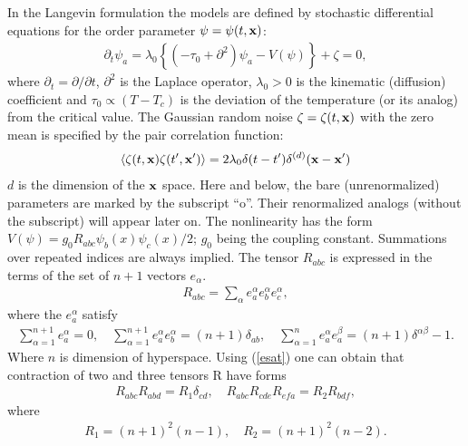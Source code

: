 \documentclass[12pt]{article}
\begin{document}
In the Langevin formulation the models are defined by stochastic
differential equations for the order parameter
$\psi = \psi(t,{\bf x})$:
\begin{eqnarray}
\partial_{t} \psi_{a} = \lambda_{0} \left\{ (-\tau_{0} +
\partial^{2}) \psi_{a} - V(\psi) \right\} + \zeta  = 0,
\label{stoh}
\end{eqnarray}
where $\partial_{t}= \partial/ \partial t$, $\partial^{2}$ is the
Laplace operator, $\lambda_{0}>0$ is the kinematic (diffusion)
coefficient and $\tau_{0} \propto (T-T_{c})$ is the deviation of
the temperature (or its analog) from the critical value.
 The Gaussian random noise
$\zeta=\zeta(t,{\bf x})$ with the zero mean is specified by the
pair correlation function:
\begin{eqnarray}
\langle \zeta (t,{\bf x})\zeta (t',{\bf x'}) \rangle =
2 \lambda_{0}  \delta(t-t')\delta^{(d)}({\bf x}-{\bf x}')
\label{kor1}
\end{eqnarray}
 $d$ is the dimension of the ${\bf x}$ space.  Here and below, the bare (unrenormalized) parameters are
marked by the subscript ``o''. Their renormalized analogs (without
the subscript) will appear later on.  The
nonlinearity has the form $V(\psi)=g_{0}R_{abc} \psi_{b}(x)\psi_{c}(x)/2$; $g_{0}$
 being the coupling constant. Summations over repeated indices are always implied.
The tensor $R_{abc}$ is expressed in the terms of the set of $n+1$ vectors $e_{\alpha}$.
\begin{eqnarray}
R_{abc}=\sum\limits_{\alpha}e^{\alpha}_{a}e^{\alpha}_{b}e^{\alpha}_{c},
\label{Rofe}
\end{eqnarray}
where the $e_{a}^{\alpha}$ satisfy
\begin{eqnarray}
\sum\limits_{\alpha=1}^{n+1}e^{\alpha}_{a}=0,\quad \sum\limits_{\alpha=1}^{n+1}e^{\alpha}_{a}e^{\alpha}_{b}=(n+1)\delta_{ab},\quad \sum\limits_{\alpha=1}^{n}e_{a}^{\alpha}e_{a}^{\beta}=(n+1)\delta^{\alpha\beta}-1.
\label{esat}
\end{eqnarray}
Where $n$ is dimension of hyperspace. Using (\ref{esat}) one can obtain that contraction of two and three tensors R have forms
\begin{eqnarray}
R_{abc}R_{abd}=R_1\delta_{cd}, \quad R_{abc}R_{cde}R_{efa}=R_2 R_{bdf},
\label{rcont}
\end{eqnarray}
where
\begin{eqnarray}
R_1=(n+1)^2(n-1),\quad R_2=(n+1)^2(n-2).
\label{r1r2}
\end{eqnarray}
\end{document}

